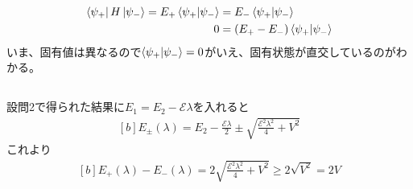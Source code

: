 \documentclass[../../sp_2017.tex]{subfiles}
\begin{document}
\subsection{}
\begin{equation}\begin{aligned}[b]
    \bra{\psi_+}H\ket{\psi_-} = E_+\braket{\psi_+}{\psi_-}&=E_-\braket{\psi_+}{\psi_-}\\
    0 &= (E_+ -E_-)\braket{\psi_+}{\psi_-}
\end{aligned}\end{equation}
いま、固有値は異なるので\(\braket{\psi_+}{\psi_-}=0\)がいえ、固有状態が直交しているのがわかる。

\subsection{}
設問2で得られた結果に\(E_1=E_2-\mathcal{E}\lambda\)を入れると
\begin{equation}\begin{aligned}[b]
    E_\pm(\lambda) = E_2 -\frac{\mathcal{E}\lambda}{2}\pm\sqrt{\frac{\mathcal{E}^2\lambda^2}{4}+V^2}
\end{aligned}\end{equation}
これより
\begin{equation}\begin{aligned}[b]
    E_+(\lambda)-E_-(\lambda) = 2\sqrt{\frac{\mathcal{E}^2\lambda^2}{4}+V^2}
    \geq 2\sqrt{V^2}=2V
\end{aligned}\end{equation}

\subsection{}
\end{document}
